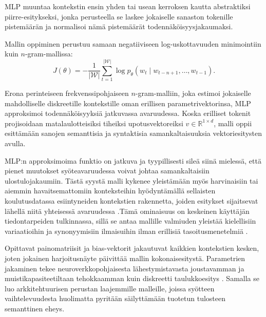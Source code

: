 MLP muuntaa kontekstin ensin yhden tai usean kerroksen kautta
abstraktiksi piirre-esitykseksi, jonka perusteella se laskee jokaiselle
sanaston tokenille pistemäärän ja normalisoi nämä pistemäärät
todennäköisyysjakaumaksi.

Mallin oppiminen perustuu samaan negatiiviseen log-uskottavuuden minimointiin kuin \(n\)-gram-mallissa:
\[
  J(\theta)
  =
  -\frac{1}{|\mathcal{W}|}
  \sum_{t=1}^{|\mathcal{W}|}
  \log p_\theta(w_t \mid w_{t-n+1}, \ldots, w_{t-1}).
\]

Erona perinteiseen frekvenssipohjaiseen \(n\)-gram-malliin, joka estimoi
jokaiselle mahdolliselle diskreetille kontekstille oman erillisen
parametrivektorinsa, MLP approksimoi todennäköisyyksiä jatkuvassa avaruudessa.
Koska erilliset tokenit projisoidaan matalaulotteisiksi tiheiksi
upotusvektoreiksi \(v \in \mathbb{R}^{1\times d}\), malli oppii esittämään sanojen
semanttisia ja syntaktisia samankaltaisuuksia vektoriesitysten avulla.

MLP:n approksimoima funktio on jatkuva ja tyypillisesti sileä siinä mielessä,
että pienet muutokset syöteavaruudessa voivat johtaa samankaltaisiin
ulostulojakaumiin. Tästä syystä malli kykenee yleistämään myös harvinaisiin tai
aiemmin havaitsemattomiin konteksteihin hyödyntämällä sellaisten
koulutusdatassa esiintyneiden kontekstien rakennetta, joiden esitykset
sijaitsevat lähellä niitä yhteisessä avaruudessa \cite{bengio2003neural}.Tämä ominaisuus on keskeinen käyttäjän
tiedontarpeiden tulkinnassa, sillä se antaa mallille valmiuden yleistää
kielellisiin variaatioihin ja synonyymisiin ilmaisuihin ilman erillisiä
tasoitusmenetelmiä \cite{huang2013learning}.

Opittavat painomatriisit ja bias-vektorit jakautuvat kaikkien kontekstien kesken,
joten jokainen harjoitusnäyte päivittää mallin kokonaisesitystä. Parametrien
jakaminen tekee neuroverkkopohjaisesta lähestymistavasta joustavamman ja
muistikapasiteetiltaan tehokkaamman kuin diskreetti taulukkoesitys
\cite{bengio2003neural,goodfellow2016deep,jurafsky2023speech}. Samalla se
luo arkkitehtuurisen perustan laajemmille malleille, joissa syötteen
vaihtelevuudesta huolimatta pyritään säilyttämään tuotetun tulosteen semanttinen
eheys.
